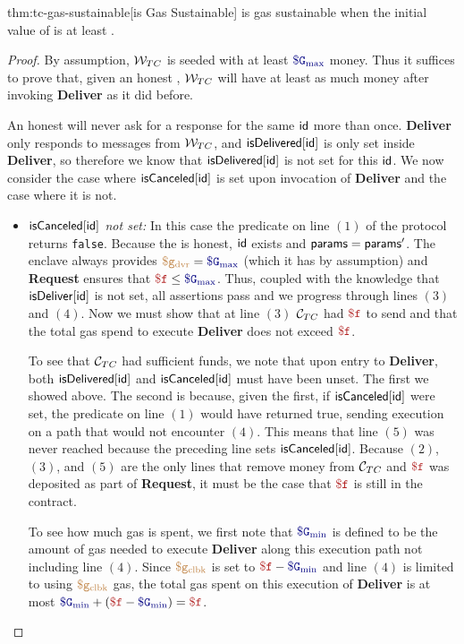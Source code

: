 \begin{retheorem}{thm:tc-gas-sustainable}[\tcs is Gas Sustainable]
\tc is gas sustainable when the initial value of \tcadd is at least \constgasmax.
\end{retheorem}

\begin{proof}
By assumption, $\tcadd$ is seeded with at least $\constgasmax$ money.
Thus it suffices to prove that, given an honest \medname, $\tcadd$ will have at least as much money after invoking {\bf Deliver} as it did before.

An honest \medname will never ask for a response for the same ${\sf id}$ more than once.
{\bf Deliver} only responds to messages from $\tcadd$, and ${\sf isDelivered}[{\sf id}]$ is only set inside {\bf Deliver},
so therefore we know that ${\sf isDelivered}[{\sf id}]$ is not set for this ${\sf id}$.
We now consider the case where ${\sf isCanceled}[{\sf id}]$ is set upon invocation of {\bf Deliver} and the case where it is not.
\begin{itemize}

\item {\it ${\sf isCanceled}[{\sf id}]$ not set:}
In this case the predicate on line $(1)$ of the protocol returns {\tt false}.
Because the \medname is honest, ${\sf id}$ exists and ${\sf params} = {\sf params}'$.
The enclave always provides $\gasdeliver = \constgasmax$ (which it has by assumption) and {\bf Request} ensures that $\fee \leq \constgasmax$.
Thus, coupled with the knowledge that ${\sf isDeliver}[{\sf id}]$ is not set, all assertions pass and we progress through lines $(3)$ and $(4)$.
Now we must show that at line $(3)$ $\tcont$ had $\fee$ to send and that the total gas spend to execute {\bf Deliver} does not exceed $\fee$.

To see that $\tcont$ had sufficient funds, we note that upon entry to {\bf Deliver}, both ${\sf isDelivered}[{\sf id}]$ and ${\sf isCanceled}[{\sf id}]$ must have been unset.
The first we showed above.
The second is because, given the first, if ${\sf isCanceled}[{\sf id}]$ were set, the predicate on line $(1)$ would have returned true, sending execution on a path that would not encounter $(4)$.
This means that line $(5)$ was never reached because the preceding line sets ${\sf isCanceled}[{\sf id}]$.
Because $(2)$, $(3)$, and $(5)$ are the only lines that remove money from $\tcont$ and $\fee$ was deposited as part of {\bf Request},
it must be the case that $\fee$ is still in the contract.

To see how much gas is spent, we first note that $\constgasmin$ is defined to be the amount of gas needed to execute {\bf Deliver} along this execution path not including line $(4)$.
Since $\textcolor{brown}{\tt \$g_\text{clbk}}$ is set to $\fee - \constgasmin$ and line $(4)$ is limited to using $\textcolor{brown}{\tt \$g_\text{clbk}}$ gas,
the total gas spent on this execution of {\bf Deliver} is at most $\constgasmin + (\fee - \constgasmin) = \fee$.



\end{itemize}
\end{proof}
